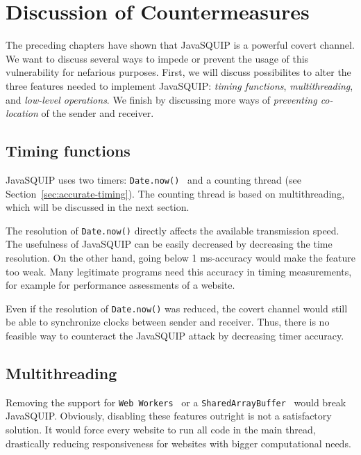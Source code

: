 \documentclass[11pt,
  titlepage=false,
  parskip=half,      %
]{scrreprt}
\begin{document}
\chapter{Discussion of Countermeasures}
\label{ch:countermeasures}

The preceding chapters have shown that JavaSQUIP is a powerful covert channel.
We want to discuss several ways to impede or prevent the usage of this vulnerability for nefarious purposes.
First, we will discuss possibilites to alter the three features needed to implement JavaSQUIP:
\textit{timing functions}, \textit{multithreading}, and \textit{low-level operations}.
We finish by discussing more ways of \textit{preventing co-location} of the sender and receiver.

\section{Timing functions}
JavaSQUIP uses two timers: \texttt{Date.now()}~\cite{datenow} and a counting thread (see Section~\ref{sec:accurate-timing}).
The counting thread is based on multithreading, which will be discussed in the next section.

The resolution of \texttt{Date.now()} directly affects the available transmission speed.
The usefulness of JavaSQUIP can be easily decreased by decreasing the time resolution.
On the other hand, going below 1 ms-accuracy would make the feature too weak.
Many legitimate programs need this accuracy in timing measurements,
for example for performance assessments of a website.

Even if the resolution of \texttt{Date.now()} was reduced,
the covert channel would still be able to synchronize clocks between sender and receiver.
Thus, there is no feasible way to counteract the JavaSQUIP attack by decreasing timer accuracy.

\section{Multithreading}
Removing the support for \texttt{Web Workers}~\cite{webworkers} or a \texttt{SharedArrayBuffer}~\cite{sharedarraybuffer}
would break JavaSQUIP.
Obviously, disabling these features outright is not a satisfactory solution.
It would force every website to run all code in the main thread,
drastically reducing responsiveness for websites with bigger computational needs.
\end{document}
